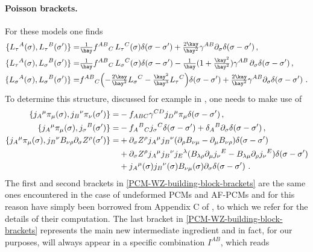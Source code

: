 \documentclass[12pt]{article}
\numberwithin{equation}{section}
\begin{document}
\paragraph{Poisson brackets.} For these models one finds
\begin{align}\label{PCM-WZ-brackets-summary}
\{ L_{\tau}{}^{A}(\sigma),L_{\tau}{}^{B}(\sigma') \} =& \tfrac{1}{\hay}f^{AB}{}_{C} \, L_{\tau}{}^{C}(\sigma)\delta(\sigma-\sigma')+\tfrac{2\kay}{\hay^2}\gamma^{AB}\partial_{\sigma}\delta(\sigma-\sigma') \, ,
\notag \\
\{ L_{\tau}{}^{A}(\sigma),L_{\sigma}{}^{B}(\sigma') \} =& \tfrac{1}{\hay}f^{AB}{}_{C} \, L_{\sigma}{}^{C}(\sigma)\delta(\sigma-\sigma')-\tfrac{1}{\hay}(1+\tfrac{\kay^2}{\hay^2})\gamma^{AB} \, \partial_{\sigma}\delta(\sigma-\sigma') \, ,
\\
\{ L_{\sigma}{}^{A}(\sigma),L_{\sigma}{}^{B}(\sigma') \} =& f^{AB}{}_{C}\Bigl(-\tfrac{2\kay}{\hay^2}L_{\sigma}{}^{C}-\tfrac{\kay^2}{\hay^3}L_{\tau}{}^{C}\Bigr)\delta(\sigma-\sigma')+\tfrac{2\kay}{\hay^2}\gamma^{AB}\partial_{\sigma}\delta(\sigma-\sigma') \,\, .
\notag
\end{align}
To determine this structure, discussed for example in \cite{Abdalla:1993sn,Evans:2000hx}, one needs to make use of
\begin{align}\label{PCM-WZ-building-block-brackets}
\{ j_{A}{}^{\mu}\pi_{\mu}(\sigma),j_{B}{}^{\nu}\pi_{\nu}(\sigma') \} =& -f_{ABC}\gamma^{CD}j_{D}{}^{\mu}\pi_{\mu}\delta(\sigma-\sigma') \, ,
\notag \\
\{ j_{A}{}^{\mu}\pi_{\mu}(\sigma),j_{\sigma}{}^{B}(\sigma') \} =& -f_{A}{}^{B}{}_{C}j_{\sigma}{}^{C}\delta(\sigma-\sigma')+\delta_{A}{}^{B}\partial_{\sigma}\delta(\sigma-\sigma') \, ,
\\
\{ j_{A}{}^{\mu}\pi_{\mu}(\sigma),j_{B}{}^{\nu}B_{\nu\rho}\partial_{\sigma}Z^{\rho}(\sigma') \} =&+ \partial_{\sigma}Z^{\rho} j_{A}{}^{\mu}j_{B}{}^{\nu}(\partial_{\rho}B_{\nu\mu}-\partial_{\mu}B_{\nu\rho})\delta(\sigma-\sigma') 
\notag \\
&+\partial_{\sigma}Z^{\rho} j_{A}{}^{\mu}j_{B}{}^{\nu}j_{E}{}^{\lambda}(B_{\lambda\rho}\partial_{\mu}j_{\nu}{}^{E}-B_{\lambda\mu}\partial_{\rho}j_{\nu}{}^{E})\delta(\sigma-\sigma') 
\notag \\
&+ j_{A}{}^{\mu}(\sigma)j_{B}{}^{\nu}(\sigma)B_{\nu\mu}(\sigma)\partial_{\sigma}\delta(\sigma-\sigma')\,\, .
\notag
\end{align}
The first and second brackets in \eqref{PCM-WZ-building-block-brackets} are the same ones encountered in the case of undeformed PCMs and AF-PCMs and for this reason have simply been borrowed from Appendix C of \cite{Bielli:2024ach}, to which we refer for the details of their computation. The last bracket in \eqref{PCM-WZ-building-block-brackets} represents the main new intermediate ingredient and in fact, for our purposes, will always appear in a specific combination $I^{AB}$, which reads
\end{document}
